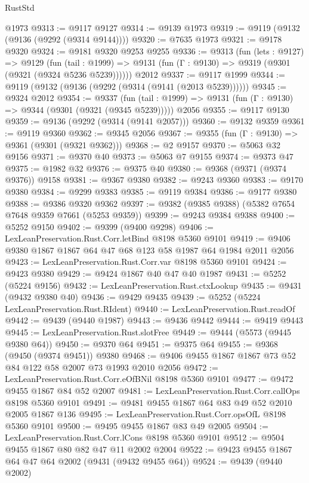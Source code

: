 \begin{lexlean}{RustStd}
\begin{coremodule}
    @1973
@9313 := @9117 @9127
@9314 := @9139 @1973
@9319 := @9119 (@9132 (@9136 (@9292 (@9314 @9144))))
@9320 := @7635 @1973
@9321 := @9178 @9320
@9324 := @9181 @9320 @9253 @9255
@9336 := @9313
    (fun (lets : @9127) =>
    @9129
      (fun (tail : @1999) => @9131 (fun (Γ : @9130) => @9319 (@9301 (@9321 (@9324 @5236 @5239))))))
    @2012
@9337 := @9117 @1999
@9344 := @9119 (@9132 (@9136 (@9292 (@9314 (@9141 (@2013 @5239))))))
@9345 := @9324 @2012
@9354 := @9337
    (fun (tail : @1999) => @9131 (fun (Γ : @9130) => @9344 (@9301 (@9321 (@9345 @5239)))))
    @2056
@9355 := @9117 @9130
@9359 := @9136 (@9292 (@9314 (@9141 @2057)))
@9360 := @9132 @9359
@9361 := @9119 @9360
@9362 := @9345 @2056
@9367 := @9355 (fun (Γ : @9130) => @9361 (@9301 (@9321 @9362)))
@9368 := @2 @9157
@9370 := @5063 @32 @9156
@9371 := @9370 @40
@9373 := @5063 @7 @9155
@9374 := @9373 @47
@9375 := @1982 @32
@9376 := @9375 @40
@9380 := @9368 (@9371 (@9374 @9376)) @9158
@9381 := @9367 @9380
@9382 := @9243 @9360
@9383 := @9170 @9380
@9384 := @9299 @9383
@9385 := @9119 @9384
@9386 := @9177 @9380
@9388 := @9386 @9320 @9362
@9397 := @9382 (@9385 @9388) (@5382 @7654 @7648 @9359 @7661 (@5253 @9359))
@9399 := @9243 @9384 @9388
@9400 := @5252 @9150
@9402 := @9399 (@9400 @9298)
@9406 := LexLeanPreservation.Rust.Corr.letBind @8198 @5360 @9101
@9419 := @9406 @9380 @1867 @1867 @64 @47 @68 @123 @58 @1987 @64 @1984 @2011 @2056
@9423 := LexLeanPreservation.Rust.Corr.var @8198 @5360 @9101
@9424 := @9423 @9380
@9429 := @9424 @1867 @40 @47 @40 @1987
@9431 := @5252 (@5224 @9156)
@9432 := LexLeanPreservation.Rust.ctxLookup
@9435 := @9431 (@9432 @9380 @40)
@9436 := @9429 @9435
@9439 := @5252 (@5224 LexLeanPreservation.Rust.RIdent)
@9440 := LexLeanPreservation.Rust.readOf
@9442 := @9439 (@9440 @1987)
@9443 := @9436 @9442
@9444 := @9419 @9443
@9445 := LexLeanPreservation.Rust.slotFree
@9449 := @9444 (@5573 (@9445 @9380 @64))
@9450 := @9370 @64
@9451 := @9375 @64
@9455 := @9368 (@9450 (@9374 @9451)) @9380
@9468 := @9406 @9455 @1867 @1867 @73 @52 @84 @122 @58 @2007 @73 @1993 @2010 @2056
@9472 := LexLeanPreservation.Rust.Corr.eOfBNil @8198 @5360 @9101
@9477 := @9472 @9455 @1867 @84 @52 @2007
@9481 := LexLeanPreservation.Rust.Corr.callOps @8198 @5360 @9101
@9491 := @9481 @9455 @1867 @64 @83 @49 @52 @2010 @2005 @1867 @136
@9495 := LexLeanPreservation.Rust.Corr.opsOfL @8198 @5360 @9101
@9500 := @9495 @9455 @1867 @83 @49 @2005
@9504 := LexLeanPreservation.Rust.Corr.lCons @8198 @5360 @9101
@9512 := @9504 @9455 @1867 @80 @82 @47 @11 @2002 @2004
@9522 := @9423 @9455 @1867 @64 @47 @64 @2002 (@9431 (@9432 @9455 @64))
@9524 := @9439 (@9440 @2002)

\end{coremodule}
\end{lexlean}
